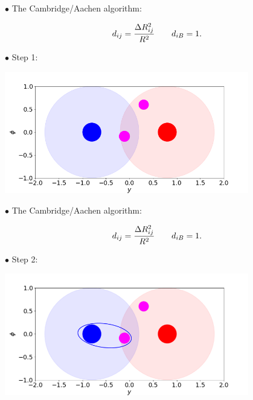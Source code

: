 \documentclass[9pt,a4paper,unknownkeysallowed,xcolor=dvipsnames,aspectratio=43]{beamer}
\begin{document}
%
%
\begin{frame}

{\color{darkred}\Large$\bullet$} {\color{darkred} The Cambridge/Aachen algorithm:}

  \begin{equation}
    d_{ij} = \frac{\Delta R_{ij}^2}{R^2}\qquad d_{iB} = 1.\notag
  \end{equation}
 \vspace{2mm}
  
{\color{darkred}\Large$\bullet$} Step 1:
\vspace{2mm}
\begin{center}
\includegraphics[width=0.8\textwidth]{ca1.png}
\end{center}
\end{frame}
%
%
\begin{frame}

{\color{darkred}\Large$\bullet$} {\color{darkred} The Cambridge/Aachen algorithm:}

  \begin{equation}
    d_{ij} = \frac{\Delta R_{ij}^2}{R^2}\qquad d_{iB} = 1.\notag
  \end{equation}
 \vspace{2mm}
  
{\color{darkred}\Large$\bullet$} Step 2:
\vspace{2mm}
\begin{center}
\includegraphics[width=0.8\textwidth]{ca12.png}
\end{center}
\end{frame}
\end{document}
